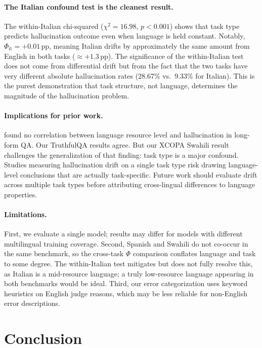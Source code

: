 \documentclass[11pt]{article}
\begin{document}
\paragraph{The Italian confound test is the cleanest result.}
The within-Italian chi-squared ($\chi^2=16.98$, $p<0.001$) shows that task
type predicts hallucination outcome even when language is held constant.
Notably, $\Phi_{\text{it}}=+0.01$\,pp, meaning Italian drifts by approximately the
same amount from English in both tasks ($\approx +1.3$\,pp). The significance
of the within-Italian test does not come from differential drift but from the
fact that the two tasks have very different absolute hallucination rates
(28.67\% vs.\ 9.33\% for Italian). This is the purest demonstration that task
structure, not language, determines the magnitude of the hallucination problem.

\paragraph{Implications for prior work.}
\citet{ulislam-etal-2025-hallucinate} found no correlation between language
resource level and hallucination in long-form QA. Our TruthfulQA results agree.
But our XCOPA Swahili result challenges the generalization of that finding:
task type is a major confound. Studies measuring hallucination drift on a
single task type risk drawing language-level conclusions that are actually
task-specific. Future work should evaluate drift across multiple task types
before attributing cross-lingual differences to language properties.

\paragraph{Limitations.}
First, we evaluate a single model; results may differ for models with different
multilingual training coverage. Second, Spanish and Swahili do not co-occur in
the same benchmark, so the cross-task $\Phi$ comparison conflates language and task
to some degree. The within-Italian test mitigates but does not fully resolve
this, as Italian is a mid-resource language; a truly low-resource language
appearing in both benchmarks would be ideal. Third, our error categorization
uses keyword heuristics on English judge reasons, which may be less reliable
for non-English error descriptions.

\section{Conclusion}
\end{document}
